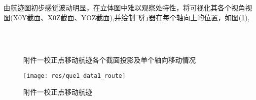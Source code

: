 由航迹图初步感觉波动明显，在立体图中难以观察处特性，将可视化其各个视角视图(X0Y截面、X0Z截面、YOZ截面),并绘制飞行器在每个轴向上的位置，如图(\ref{fig:res-qu1-1-add}),\shuoming
\begin{figure}[!htbp]
	\centering
	 \quad
	 \\
     \quad
	 \\
     \quad
	\caption{附件一校正点移动航迹各个截面投影及单个轴向移动情况}
	\label{fig:res-qu1-1-add}
\end{figure}

\begin{figure}[htbp!]
    \centering
    \texttt{[image: res/que1\_data1\_route]}
    \caption{附件一校正点移动航迹}
    \label{fig:res-qu1-1}
\end{figure}

